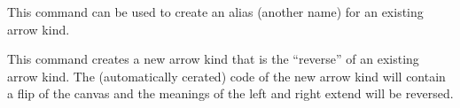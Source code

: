 \begin{command}{\pgfarrowsdeclarealias{}}
  This command can be used to create an alias (another name) for an
  existing arrow kind.

\begin{codeexample}[]
%
\begin{pgfpicture}
  \pgfsetarrows{<->}
  \pgfsetlinewidth{1ex}
  \pgfpathmoveto{\pgfpointorigin}
  \pgfpathlineto{\pgfpoint{4cm}{2cm}}
\end{pgfpicture}
\end{codeexample}
\end{command}


\begin{command}{\pgfarrowsdeclarereversed{}}
  This command creates a new arrow kind that is the ``reverse'' of an
  existing arrow kind. The (automatically cerated) code of the new
  arrow kind will contain a flip of the canvas and the meanings of the
  left and right extend will be reversed. 

\begin{codeexample}[]
%
\begin{pgfpicture}
  \pgfsetlinewidth{1ex}
  \pgfpathmoveto{\pgfpointorigin}
  \pgfpathlineto{\pgfpoint{4cm}{2cm}}
\end{pgfpicture}
\end{codeexample}
\end{command}




